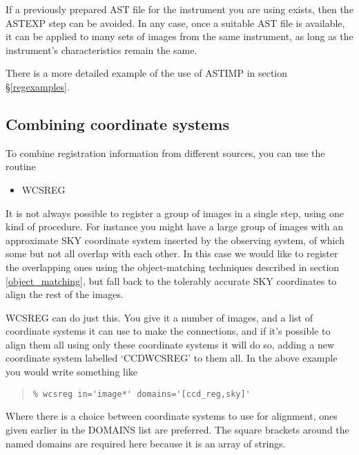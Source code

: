 \documentclass[twoside,11pt]{article}
\newcommand{\htmlref}[2]{#1}
\newcommand{\xlabel}[1]{}
\renewcommand{\_}{\texttt{\symbol{95}}}
\newenvironment{myquote}{\begin{quote}\begin{small}}{\end{small}\end{quote}}
\newcommand{\routine}[1]{{\sc #1}}
\newcommand{\xroutine}[1]{\htmlref{{\sc #1}}{#1}}
\begin{document}
If a previously prepared AST file for the instrument you are using
exists, then the \routine{ASTEXP} step can be avoided.
In any case, once a suitable AST file is available, 
it can be applied to many sets of images from the same instrument,
as long as the instrument's characteristics remain the same.

There is a more detailed example of the use of \routine{ASTIMP} in 
section \S\ref{regexamples}.



\subsection{\xlabel{wcscombine}\label{wcscombine}Combining coordinate systems}

To combine registration information from different sources, you can
use the routine
\begin{itemize}
\item \xroutine{WCSREG}
\end{itemize}

It is not always possible to register a group of images in a single
step, using one kind of procedure.  For instance you might have
a large group of images with an approximate SKY coordinate system
inserted by the observing system, 
of which some but not all overlap with each other.
In this case we would like to register the overlapping ones
using the object-matching
techniques described in section \ref{object_matching},
but fall back to
the tolerably accurate SKY coordinates to align the rest of the images. 

\routine{WCSREG} can do just this.
You give it a number of images, and a list of coordinate systems
it can use to make the connections,
and if it's possible to align them all using only these coordinate
systems it will do so,
adding a new coordinate system labelled `CCD\_WCSREG' to them all.
In the above example you would write something like
\begin{myquote}
\begin{verbatim}
% wcsreg in='image*' domains='[ccd_reg,sky]'
\end{verbatim}
\end{myquote}
Where there is a choice between coordinate systems to use for alignment,
ones given earlier in the DOMAINS list are preferred.
The square brackets around the named domains are required here because it
is an array of strings.
\end{document}
